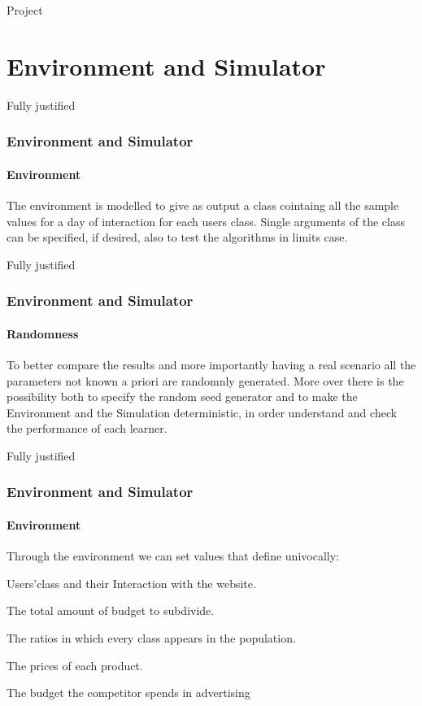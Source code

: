 \documentclass{beamer}
\begin{document}
\frame{\titlepage}

\begin{frame}{Project}
    \tableofcontents[hideallsubsections]
\end{frame}


\AtBeginSection[]
{
\begin{frame}{}
    \tableofcontents[currentsection]
\end{frame}
}


\section{Environment and Simulator}

\begin{frame}{Fully justified}

\frametitle{Environment and Simulator}
\framesubtitle{Environment}
The environment is modelled to give as output a class cointaing all the sample values for a day of interaction for each users class.
Single arguments of the class can be specified, if desired, also to test the algorithms in limits case.

\end{frame}


\begin {frame} {Fully justified}

\frametitle{Environment and Simulator}
\framesubtitle{Randomness}
To better compare the results and more importantly having a real scenario all the parameters not known a priori are randomnly generated.
More over there is the possibility both to specify the random seed generator and to make the Environment and the Simulation deterministic, in order understand and check the performance of each learner.

\end {frame}


\begin{frame}{Fully justified}

\frametitle{Environment and Simulator}
\framesubtitle{Environment}
Through the environment we can set values that define univocally:
\vspace{0.5cm}
\begin{list}{-}{\setlength{\itemsep}{0.5cm}}
    \item Users'class and their Interaction with the website.
    \item The total amount of budget to subdivide.
    \item The ratios in which every class appears in the population.
    \item The prices of each product.
    \item The budget the competitor spends in advertising
\end{list}

\end {frame}
\end{document}
